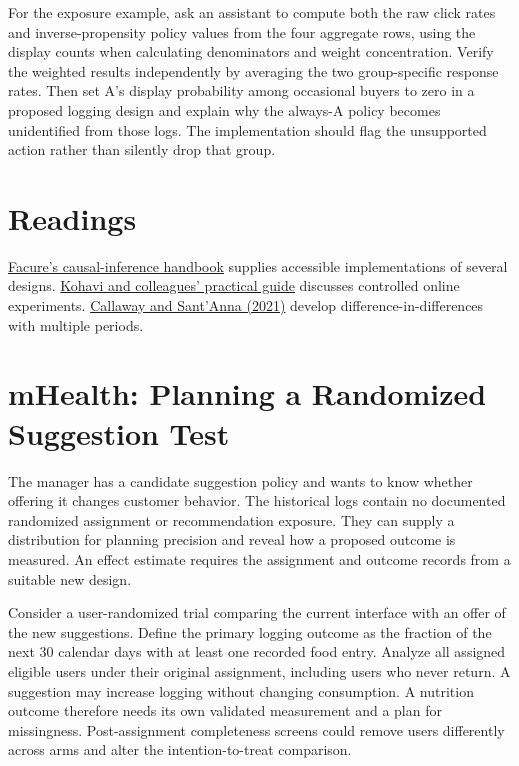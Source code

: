 For the exposure example, ask an assistant to compute both the raw click
rates and inverse-propensity policy values from the four aggregate rows,
using the display counts when calculating denominators and weight
concentration. Verify the weighted results independently by averaging
the two group-specific response rates. Then set A's display probability
among occasional buyers to zero in a proposed logging design and explain
why the always-A policy becomes unidentified from those logs. The
implementation should flag the unsupported action rather than silently
drop that group.

\hypertarget{M06-readings}{%
\section{Readings}\label{M06-readings}}

\noindent \href{https://matheusfacure.github.io/python-causality-handbook/landing-page.html}{Facure's
causal-inference handbook} supplies accessible implementations of
several designs.
\href{https://exp-platform.com/Documents/GuideControlledExperiments.pdf}{Kohavi
and colleagues' practical guide} discusses controlled online
experiments.
\href{https://doi.org/10.1016/j.jeconom.2020.12.001}{Callaway and
Sant'Anna (2021)} develop difference-in-differences with multiple
periods.

\hypertarget{M06-mhealth-planning-a-randomized-suggestion-test}{%
\section{mHealth: Planning a Randomized Suggestion
Test}\label{M06-mhealth-planning-a-randomized-suggestion-test}}

\noindent The manager has a candidate suggestion policy and wants to know whether
offering it changes customer behavior. The historical logs contain no
documented randomized assignment or recommendation exposure. They can
supply a distribution for planning precision and reveal how a proposed
outcome is measured. An effect estimate requires the assignment and
outcome records from a suitable new design.

Consider a user-randomized trial comparing the current interface with an
offer of the new suggestions. Define the primary logging outcome as the
fraction of the next 30 calendar days with at least one recorded food
entry. Analyze all assigned eligible users under their original
assignment, including users who never return. A suggestion may increase
logging without changing consumption. A nutrition outcome therefore
needs its own validated measurement and a plan for missingness.
Post-assignment completeness screens could remove users differently
across arms and alter the intention-to-treat comparison.

